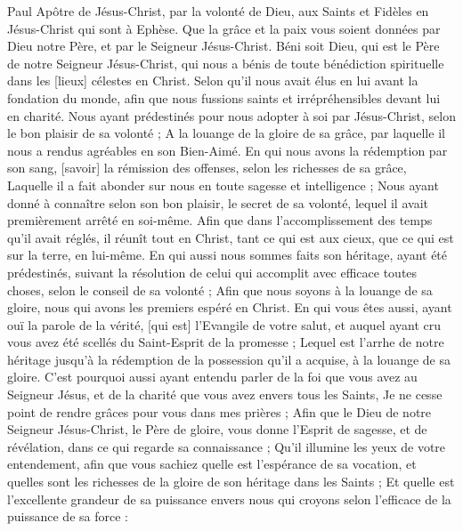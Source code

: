 \BFont
\begin{multicols}{2}
\VerseOne{}Paul Apôtre de Jésus-Christ, par la volonté de Dieu, aux Saints et Fidèles en Jésus-Christ qui sont à Ephèse.
Que la grâce et la paix vous soient données par Dieu notre Père, et par le Seigneur Jésus-Christ.
Béni soit Dieu, qui est le Père de notre Seigneur Jésus-Christ, qui nous a bénis de toute bénédiction spirituelle dans les [lieux] célestes en Christ.
Selon qu'il nous avait élus en lui avant la fondation du monde, afin que nous fussions saints et irrépréhensibles devant lui en charité.
Nous ayant prédestinés pour nous adopter à soi par Jésus-Christ, selon le bon plaisir de sa volonté ;
A la louange de la gloire de sa grâce, par laquelle il nous a rendus agréables en son Bien-Aimé.
En qui nous avons la rédemption par son sang, [savoir] la rémission des offenses, selon les richesses de sa grâce,
Laquelle il a fait abonder sur nous en toute sagesse et intelligence ;
Nous ayant donné à connaître selon son bon plaisir, le secret de sa volonté, lequel il avait premièrement arrêté en soi-même.
Afin que dans l'accomplissement des temps qu'il avait réglés, il réunît tout en Christ, tant ce qui est aux cieux, que ce qui est sur la terre, en lui-même.
En qui aussi nous sommes faits son héritage, ayant été prédestinés, suivant la résolution de celui qui accomplit avec efficace toutes choses, selon le conseil de sa volonté ;
Afin que nous soyons à la louange de sa gloire, nous qui avons les premiers espéré en Christ.
En qui vous êtes aussi, ayant ouï la parole de la vérité, [qui est] l'Evangile de votre salut, et auquel ayant cru vous avez été scellés du Saint-Esprit de la promesse ;
Lequel est l'arrhe de notre héritage jusqu'à la rédemption de la possession qu'il a acquise, à la louange de sa gloire.
C'est pourquoi aussi ayant entendu parler de la foi que vous avez au Seigneur Jésus, et de la charité que vous avez envers tous les Saints,
Je ne cesse point de rendre grâces pour vous dans mes prières ;
Afin que le Dieu de notre Seigneur Jésus-Christ, le Père de gloire, vous donne l'Esprit de sagesse, et de révélation, dans ce qui regarde sa connaissance ;
Qu'il illumine les yeux de votre entendement, afin que vous sachiez quelle est l'espérance de sa vocation, et quelles sont les richesses de la gloire de son héritage dans les Saints ;
Et quelle est l'excellente grandeur de sa puissance envers nous qui croyons selon l'efficace de la puissance de sa force :

\end{multicols}
